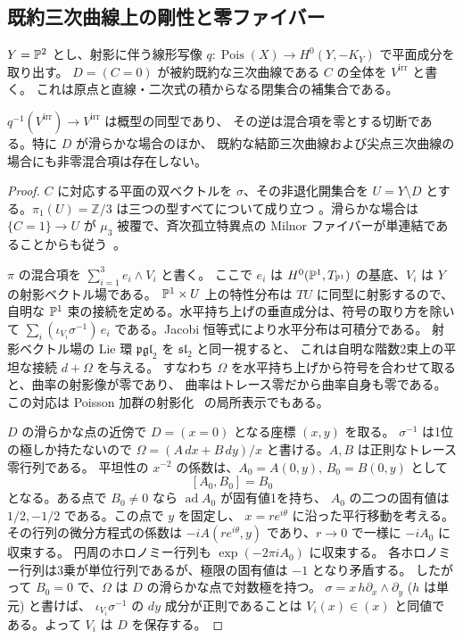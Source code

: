 \subsection{既約三次曲線上の剛性と零ファイバー}
$Y=\mathbb P^2$ とし、射影に伴う線形写像
$q:\operatorname{Pois}(X)\to H^0(Y,-K_Y)$ で平面成分を取り出す。
$D=(C=0)$ が被約既約な三次曲線である $C$ の全体を $V^{\mathrm{irr}}$ と書く。
これは原点と直線・二次式の積からなる閉集合の補集合である。

\begin{theorem}\label{p12:th:irreducible-cubic}
$q^{-1}(V^{\mathrm{irr}})\to V^{\mathrm{irr}}$ は概型の同型であり、
その逆は混合項を零とする切断である。特に $D$ が滑らかな場合のほか、
既約な結節三次曲線および尖点三次曲線の場合にも非零混合項は存在しない。
\end{theorem}
\begin{proof}
$C$ に対応する平面の双ベクトルを $\sigma$、その非退化開集合を
$U=Y\setminus D$ とする。$\pi_1(U)=\mathbb Z/3$ は三つの型すべてについて成り立つ
\cite[\S2.3.2, (3e)]{p12-Cogolludo}。滑らかな場合は
$\{C=1\}\to U$ が $\mu_3$ 被覆で、斉次孤立特異点の Milnor
ファイバーが単連結であることからも従う~\cite[\S\S5--6]{p12-Milnor}。

$\pi$ の混合項を $\sum_{i=1}^3 e_i\wedge V_i$ と書く。
ここで $e_i$ は $H^0(\mathbb P^1,T_{\mathbb P^1})$ の基底、$V_i$ は $Y$ の射影ベクトル場である。
$\mathbb P^1\times U$ 上の特性分布は $TU$ に同型に射影するので、
自明な $\mathbb P^1$ 束の接続を定める。水平持ち上げの垂直成分は、符号の取り方を除いて
$\sum_i (\iota_{V_i}\sigma^{-1})\,e_i$ である。Jacobi 恒等式により水平分布は可積分である。
射影ベクトル場の Lie 環 $\mathfrak{pgl}_2$ を $\mathfrak{sl}_2$ と同一視すると、
これは自明な階数2束上の平坦な接続 $d+\Omega$ を与える。
すなわち $\Omega$ を水平持ち上げから符号を合わせて取ると、曲率の射影像が零であり、
曲率はトレース零だから曲率自身も零である。
この対応は Poisson 加群の射影化~\cite{Polishchuk1997} の局所表示でもある。

$D$ の滑らかな点の近傍で $D=(x=0)$ となる座標 $(x,y)$ を取る。
$\sigma^{-1}$ は1位の極しか持たないので
$\Omega=(A\,dx+B\,dy)/x$ と書ける。$A,B$ は正則なトレース零行列である。
平坦性の $x^{-2}$ の係数は、$A_0=A(0,y),\,B_0=B(0,y)$ として
\[
 [A_0,B_0]=B_0
\]
となる。ある点で $B_0\ne0$ なら $\operatorname{ad} A_0$ が固有値1を持ち、
$A_0$ の二つの固有値は $1/2,-1/2$ である。この点で $y$ を固定し、
$x=r e^{i\theta}$ に沿った平行移動を考える。その行列の微分方程式の係数は
$-i A(r e^{i\theta},y)$ であり、$r\to0$ で一様に $-i A_0$ に収束する。
円周のホロノミー行列も $\exp(-2\pi i A_0)$ に収束する。
各ホロノミー行列は3乗が単位行列であるが、極限の固有値は $-1$ となり矛盾する。
したがって $B_0=0$ で、$\Omega$ は $D$ の滑らかな点で対数極を持つ。
$\sigma=x\,h\partial_x\wedge\partial_y$ ($h$ は単元) と書けば、
$\iota_{V_i}\sigma^{-1}$ の $dy$ 成分が正則であることは
$V_i(x)\in(x)$ と同値である。よって $V_i$ は $D$ を保存する。


\end{proof}
